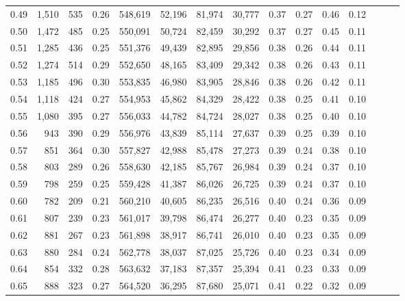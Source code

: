 \begin{tabular}{rrrrrrrrrrrrrrr}
0.49 &   1,510 &    535 &  0.26 &  548,619 &   52,196 &   81,974 &   30,777 &  0.37 &  0.27 &  0.46 &      0.12 \\
0.50 &   1,472 &    485 &  0.25 &  550,091 &   50,724 &   82,459 &   30,292 &  0.37 &  0.27 &  0.45 &      0.11 \\
0.51 &   1,285 &    436 &  0.25 &  551,376 &   49,439 &   82,895 &   29,856 &  0.38 &  0.26 &  0.44 &      0.11 \\
0.52 &   1,274 &    514 &  0.29 &  552,650 &   48,165 &   83,409 &   29,342 &  0.38 &  0.26 &  0.43 &      0.11 \\
0.53 &   1,185 &    496 &  0.30 &  553,835 &   46,980 &   83,905 &   28,846 &  0.38 &  0.26 &  0.42 &      0.11 \\
0.54 &   1,118 &    424 &  0.27 &  554,953 &   45,862 &   84,329 &   28,422 &  0.38 &  0.25 &  0.41 &      0.10 \\
0.55 &   1,080 &    395 &  0.27 &  556,033 &   44,782 &   84,724 &   28,027 &  0.38 &  0.25 &  0.40 &      0.10 \\
0.56 &     943 &    390 &  0.29 &  556,976 &   43,839 &   85,114 &   27,637 &  0.39 &  0.25 &  0.39 &      0.10 \\
0.57 &     851 &    364 &  0.30 &  557,827 &   42,988 &   85,478 &   27,273 &  0.39 &  0.24 &  0.38 &      0.10 \\
0.58 &     803 &    289 &  0.26 &  558,630 &   42,185 &   85,767 &   26,984 &  0.39 &  0.24 &  0.37 &      0.10 \\
0.59 &     798 &    259 &  0.25 &  559,428 &   41,387 &   86,026 &   26,725 &  0.39 &  0.24 &  0.37 &      0.10 \\
0.60 &     782 &    209 &  0.21 &  560,210 &   40,605 &   86,235 &   26,516 &  0.40 &  0.24 &  0.36 &      0.09 \\
0.61 &     807 &    239 &  0.23 &  561,017 &   39,798 &   86,474 &   26,277 &  0.40 &  0.23 &  0.35 &      0.09 \\
0.62 &     881 &    267 &  0.23 &  561,898 &   38,917 &   86,741 &   26,010 &  0.40 &  0.23 &  0.35 &      0.09 \\
0.63 &     880 &    284 &  0.24 &  562,778 &   38,037 &   87,025 &   25,726 &  0.40 &  0.23 &  0.34 &      0.09 \\
0.64 &     854 &    332 &  0.28 &  563,632 &   37,183 &   87,357 &   25,394 &  0.41 &  0.23 &  0.33 &      0.09 \\
0.65 &     888 &    323 &  0.27 &  564,520 &   36,295 &   87,680 &   25,071 &  0.41 &  0.22 &  0.32 &      0.09 \\

\end{tabular}

